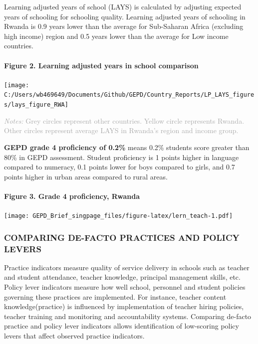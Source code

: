 \documentclass[
]{article}
\begin{document}
Learning adjusted years of school (LAYS) is calculated by adjusting
expected years of schooling for schooling quality. Learning adjusted
years of schooling in Rwanda is 0.9 years lower than the average for
Sub-Saharan Africa (excluding high income) region and 0.5 years lower
than the average for Low income countries.

\hypertarget{figure-2.-learning-adjusted-years-in-school-comparison}{%
\paragraph{Figure 2. Learning adjusted years in school
comparison}\label{figure-2.-learning-adjusted-years-in-school-comparison}}

\texttt{[image: C:/Users/wb469649/Documents/Github/GEPD/Country\_Reports/LP\_LAYS\_figures/lays\_figure\_RWA]}

{\scriptsize
    \textcolor{darkgray}{\textit{Notes:} Grey circles represent other countries. Yellow circle represents Rwanda. Other circles represent average LAYS in Rwanda's region and income group.}
  }

\textbf{GEPD grade 4 proficiency of 0.2\%} means 0.2\% students score
greater than 80\% in GEPD assessment. Student proficiency is 1 points
higher in language compared to numeracy, 0.1 points lower for boys
compared to girls, and 0.7 points higher in urban areas compared to
rural areas. \vfill\null

\hypertarget{figure-3.-grade-4-proficiency-rwanda}{%
\paragraph{Figure 3. Grade 4 proficiency,
Rwanda}\label{figure-3.-grade-4-proficiency-rwanda}}

\texttt{[image: GEPD\_Brief\_singpage\_files/figure-latex/lern\_teach-1.pdf]}

\hypertarget{comparing-de-facto-practices-and-policy-levers}{%
\subsubsection{\texorpdfstring{\textbf{COMPARING DE-FACTO PRACTICES AND
POLICY
LEVERS}}{COMPARING DE-FACTO PRACTICES AND POLICY LEVERS}}\label{comparing-de-facto-practices-and-policy-levers}}

Practice indicators measure quality of service delivery in schools such
as teacher and student attendance, teacher knowledge, principal
management skills, etc. Policy lever indicators measure how well school,
personnel and student policies governing these practices are
implemented. For instance, teacher content knowledge(practice) is
influenced by implementation of teacher hiring policies, teacher
training and monitoring and accountability systems. Comparing de-facto
practice and policy lever indicators allows identification of
low-scoring policy levers that affect observed practice indicators.
\end{document}
